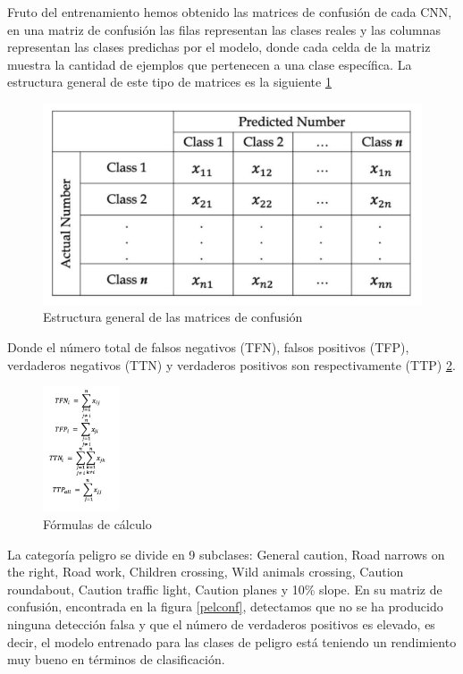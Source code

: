 Fruto del entrenamiento hemos obtenido las matrices de confusión de cada CNN, en una matriz de confusión las filas representan las clases reales y las columnas representan las clases predichas por el modelo, donde cada celda de la matriz muestra la cantidad de ejemplos que pertenecen a una clase específica. La estructura general de este tipo de matrices es la siguiente \ref{genconf} \cite{cm}\\

\begin{figure}[H]
    \centering
 	\includegraphics[width=\textwidth]{Imagenes/IA/general_confusion.pdf}
    \caption{Estructura general de las matrices de confusión}
    \label{genconf}
\end{figure}

Donde el número total de falsos negativos (TFN), falsos positivos (TFP), verdaderos negativos (TTN) y verdaderos positivos son respectivamente (TTP) \ref{forconf}.\\

\begin{figure}[H]
    \centering
 	\includegraphics[width=0.2\textwidth]{Imagenes/IA/formulas_confusion.pdf}
    \caption{Fórmulas de cálculo}
    \label{forconf}
\end{figure}

La categoría peligro se divide en 9 subclases: General caution, Road narrows on the right, Road work, Children crossing, Wild animals crossing, Caution roundabout, Caution traffic light, Caution planes y 10\% slope. En su matriz de confusión, encontrada en la figura \ref{pelconf}, detectamos que no se ha producido ninguna detección falsa y que el número de verdaderos positivos es elevado, es decir, el modelo entrenado para las clases de peligro está teniendo un rendimiento muy bueno en términos de clasificación.\\

